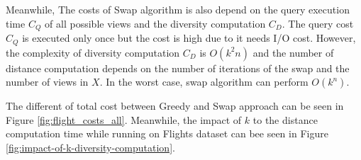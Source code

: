 \documentclass{article}
\begin{document}
Meanwhile, The costs of Swap algorithm is also depend on the query execution time $C_Q$ of all possible views and the diversity computation $C_D$. The query cost $C_Q$ is executed only once but the cost is high due to it needs I/O cost. However, the complexity of diversity computation $C_D$ is $ O\left(k^2n \right) $ and the number of distance computation depends on the number of iterations of the swap and the number of views in $X$. In the worst case, swap algorithm can perform $ O\left(k^n \right) $. 

The different of total cost between Greedy and Swap approach can be seen in Figure \ref{fig:flight_costs_all}. Meanwhile, the impact of $k$ to the distance computation time while running on Flights dataset can bee seen in Figure \ref{fig:impact-of-k-diversity-computation}.
\end{document}
